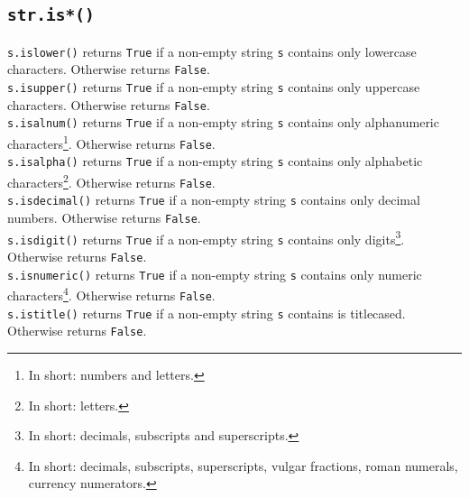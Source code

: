 \documentclass[t,handout,9pt]{beamer}
\begin{document}
\subsection{\texttt{str.is*()}}
\begin{frame}
\texttt{s.islower()} returns \texttt{True} if a non-empty string \texttt{s} contains only lowercase characters. Otherwise returns \texttt{False}.\\
\texttt{s.isupper()} returns \texttt{True} if a non-empty string \texttt{s} contains only uppercase characters. Otherwise returns \texttt{False}.\\
\texttt{s.isalnum()} returns \texttt{True} if a non-empty string \texttt{s} contains only alphanumeric characters\footnote{In short: numbers and letters.}. Otherwise returns \texttt{False}.\\
\texttt{s.isalpha()} returns \texttt{True} if a non-empty string \texttt{s} contains only alphabetic characters\footnote{In short: letters.}. Otherwise returns \texttt{False}.\\
\texttt{s.isdecimal()} returns \texttt{True} if a non-empty string \texttt{s} contains only decimal numbers. Otherwise returns \texttt{False}.\\
\texttt{s.isdigit()} returns \texttt{True} if a non-empty string \texttt{s} contains only digits\footnote{In short: decimals, subscripts and superscripts.}. Otherwise returns \texttt{False}.\\
\texttt{s.isnumeric()} returns \texttt{True} if a non-empty string \texttt{s} contains only numeric characters\footnote{In short: decimals, subscripts, superscripts, vulgar fractions, roman numerals, currency numerators.}. Otherwise returns \texttt{False}.\\
\texttt{s.istitle()} returns \texttt{True} if a non-empty string \texttt{s} contains is titlecased. Otherwise returns \texttt{False}.\\
\vfill
\end{frame}
\end{document}
